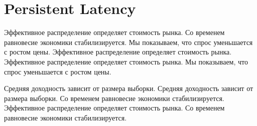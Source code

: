 \documentclass[11pt]{article}
\begin{document}
\section{Persistent Latency}\label{sec:7}

Эффективное распределение определяет стоимость рынка. Со временем равновесие экономики стабилизируется. Мы показываем, что спрос уменьшается с ростом цены. Эффективное распределение определяет стоимость рынка. Эффективное распределение определяет стоимость рынка. Мы показываем, что спрос уменьшается с ростом цены.

Средняя доходность зависит от размера выборки. Средняя доходность зависит от размера выборки. Со временем равновесие экономики стабилизируется. Эффективное распределение определяет стоимость рынка. Со временем равновесие экономики стабилизируется.
\end{document}
